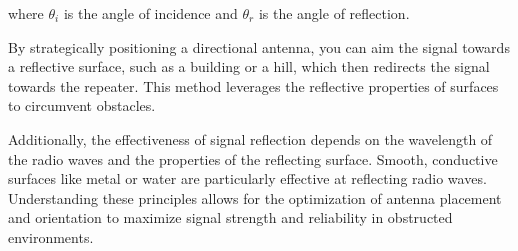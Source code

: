 where \(\theta_i\) is the angle of incidence and \(\theta_r\) is the angle of reflection.

By strategically positioning a directional antenna, you can aim the signal towards a reflective surface, such as a building or a hill, which then redirects the signal towards the repeater. This method leverages the reflective properties of surfaces to circumvent obstacles.

Additionally, the effectiveness of signal reflection depends on the wavelength of the radio waves and the properties of the reflecting surface. Smooth, conductive surfaces like metal or water are particularly effective at reflecting radio waves. Understanding these principles allows for the optimization of antenna placement and orientation to maximize signal strength and reliability in obstructed environments.

